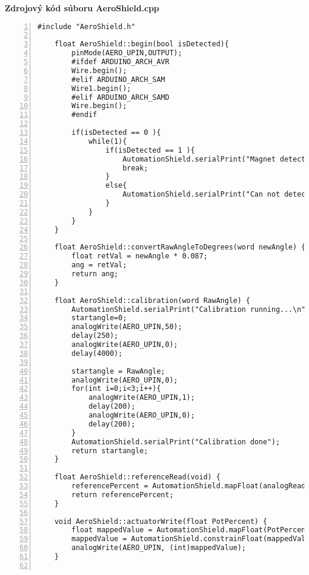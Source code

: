 \LARGE\bf{Zdrojový kód súboru AeroShield.cpp}
\label{AeroShield.cpp}
\vspace{1cm}
\begin{lstlisting}[numbers=left,basicstyle=\tiny,caption={Zdrojový kód súboru AeroShield.cpp.},captionpos=b]	
	#include "AeroShield.h"     
	
	float AeroShield::begin(bool isDetected){   
		pinMode(AERO_UPIN,OUTPUT);  		   
		#ifdef ARDUINO_ARCH_AVR      
		Wire.begin();                            
		#elif ARDUINO_ARCH_SAM                            
		Wire1.begin();                
		#elif ARDUINO_ARCH_SAMD         
		Wire.begin();                            
		#endif
		
		if(isDetected == 0 ){                
			while(1){                                    
				if(isDetected == 1 ){                          
					AutomationShield.serialPrint("Magnet detected \n");
					break;
				}
				else{                                                 
					AutomationShield.serialPrint("Can not detect magnet \n"); 
				}
			}
		}       
	} 
	
	float AeroShield::convertRawAngleToDegrees(word newAngle) {
		float retVal = newAngle * 0.087;      
		ang = retVal;                               
		return ang;                  
	}
	
	float AeroShield::calibration(word RawAngle) {      
		AutomationShield.serialPrint("Calibration running...\n");  
		startangle=0;                                
		analogWrite(AERO_UPIN,50);              
		delay(250);                              
		analogWrite(AERO_UPIN,0);              
		delay(4000);    
		
		startangle = RawAngle;                                 
		analogWrite(AERO_UPIN,0);                     
		for(int i=0;i<3;i++){                  
			analogWrite(AERO_UPIN,1);                 
			delay(200);                           
			analogWrite(AERO_UPIN,0);                                
			delay(200);                                     
		}
		AutomationShield.serialPrint("Calibration done");
		return startangle;                                         
	}
	
	float AeroShield::referenceRead(void) {                                                
		referencePercent = AutomationShield.mapFloat(analogRead(AERO_RPIN), 0.0, 1024.0, 0.0, 100.0);   
		return referencePercent;                                     
	}
	
	void AeroShield::actuatorWrite(float PotPercent) {       
		float mappedValue = AutomationShield.mapFloat(PotPercent, 0.0, 100.0, 0.0, 255.0);  
		mappedValue = AutomationShield.constrainFloat(mappedValue, 0.0, 255.0);
		analogWrite(AERO_UPIN, (int)mappedValue);    
	}
	

\end{lstlisting}
